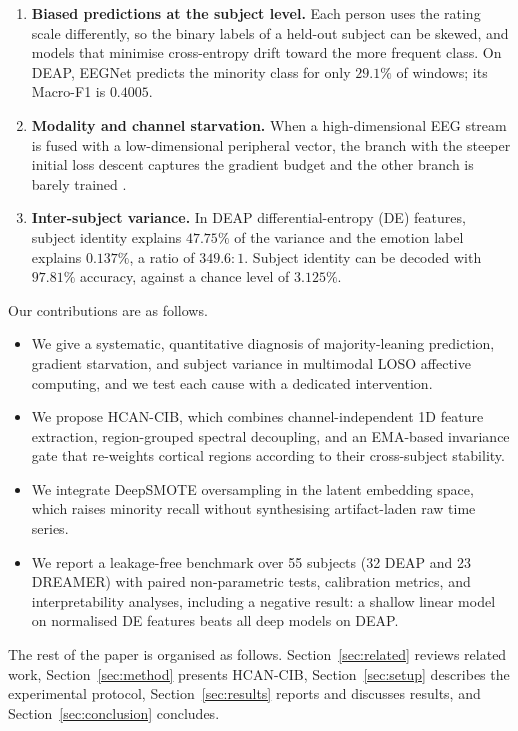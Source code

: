 \documentclass[a4paper,fleqn]{cas-sc}
\begin{document}
\begin{enumerate}
\item \textbf{Biased predictions at the subject level.} Each person uses the rating scale differently, so the binary labels of a held-out subject can be skewed, and models that minimise cross-entropy drift toward the more frequent class. On DEAP, EEGNet predicts the minority class for only $29.1\%$ of windows; its Macro-F1 is $0.4005$.
\item \textbf{Modality and channel starvation.} When a high-dimensional EEG stream is fused with a low-dimensional peripheral vector, the branch with the steeper initial loss descent captures the gradient budget and the other branch is barely trained \citep{pezeshki2021gradient,wang2020makes}.
\item \textbf{Inter-subject variance.} In DEAP differential-entropy (DE) features, subject identity explains $47.75\%$ of the variance and the emotion label explains $0.137\%$, a ratio of $349.6{:}1$. Subject identity can be decoded with $97.81\%$ accuracy, against a chance level of $3.125\%$.
\end{enumerate}

Our contributions are as follows.
\begin{itemize}
\item We give a systematic, quantitative diagnosis of majority-leaning prediction, gradient starvation, and subject variance in multimodal LOSO affective computing, and we test each cause with a dedicated intervention.
\item We propose HCAN-CIB, which combines channel-independent 1D feature extraction, region-grouped spectral decoupling, and an EMA-based invariance gate that re-weights cortical regions according to their cross-subject stability.
\item We integrate DeepSMOTE oversampling in the latent embedding space, which raises minority recall without synthesising artifact-laden raw time series.
\item We report a leakage-free benchmark over 55 subjects (32 DEAP and 23 DREAMER) with paired non-parametric tests, calibration metrics, and interpretability analyses, including a negative result: a shallow linear model on normalised DE features beats all deep models on DEAP.
\end{itemize}

The rest of the paper is organised as follows. Section~\ref{sec:related} reviews related work, Section~\ref{sec:method} presents HCAN-CIB, Section~\ref{sec:setup} describes the experimental protocol, Section~\ref{sec:results} reports and discusses results, and Section~\ref{sec:conclusion} concludes.
\end{document}
